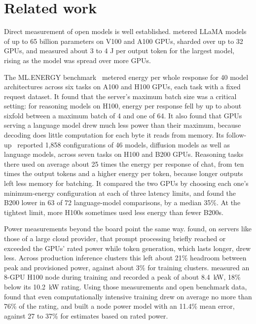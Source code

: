 \documentclass[11pt]{article}
\begin{document}
\section{Related work}\label{sec:related}

Direct measurement of open models is well established. \citet{samsi2023words} metered LLaMA models of up to 65 billion parameters on V100 and A100 GPUs, sharded over up to 32 GPUs, and measured about 3 to 4 J per output token for the largest model, rising as the model was spread over more GPUs.

The ML.ENERGY benchmark~\citep{chung2025mlenergy} metered energy per whole response for 40 model architectures across six tasks on A100 and H100 GPUs, each task with a fixed request dataset. It found that the server's maximum batch size was a critical setting: for reasoning models on H100, energy per response fell by up to about sixfold between a maximum batch of 4 and one of 64. It also found that GPUs serving a language model drew much less power than their maximum, because decoding does little computation for each byte it reads from memory. Its follow-up~\citep{chung2026joules} reported 1,858 configurations of 46 models, diffusion models as well as language models, across seven tasks on H100 and B200 GPUs. Reasoning tasks there used on average about 25 times the energy per response of chat, from ten times the output tokens and a higher energy per token, because longer outputs left less memory for batching. It compared the two GPUs by choosing each one's minimum-energy configuration at each of three latency limits, and found the B200 lower in 63 of 72 language-model comparisons, by a median 35\%. At the tightest limit, more H100s sometimes used less energy than fewer B200s.

Power measurements beyond the board point the same way. \citet{patel2024power} found, on servers like those of a large cloud provider, that prompt processing briefly reached or exceeded the GPUs' rated power while token generation, which lasts longer, drew less. Across production inference clusters this left about 21\% headroom between peak and provisioned power, against about 3\% for training clusters. \citet{latif2025singlenode} measured an 8-GPU H100 node during training and recorded a peak of about 8.4~kW, 18\% below its 10.2~kW rating. Using those measurements and open benchmark data, \citet{newkirk2025calibrated} found that even computationally intensive training drew on average no more than 76\% of the rating, and built a node power model with an 11.4\% mean error, against 27 to 37\% for estimates based on rated power.
\end{document}
